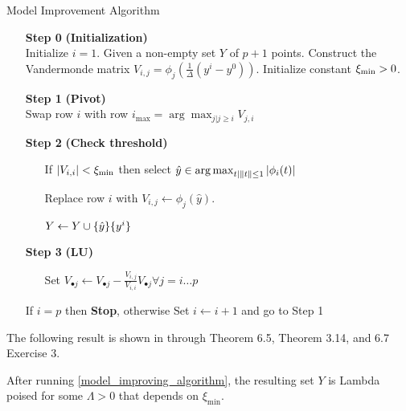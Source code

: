 \begin{algorithm}[H]
    \caption{Model Improvement Algorithm}
    \label{model_improving_algorithm}
    \begin{itemize}
        \item[\textbf{Step 0}] \textbf{(Initialization)} \\
            Initialize $i=1$.
            Given a non-empty set $Y$ of $p+1$ points. 
            Construct the Vandermonde matrix $V_{i,j} = \phi_j(\frac 1 {\Delta}(y^i - y^0))$.
			Initialize constant $\xi_{\text{min}} > 0$.
        \item[\textbf{Step 1}] \textbf{(Pivot)} \\
            Swap row $i$ with row $i_{\max} = \arg \max_{j|j\ge i} V_{j,i} $
        
        \item[\textbf{Step 2}] \textbf{(Check threshold)} \begin{itemize}
                \item[] If $|V_{i,i}| < \xi_{\text{min}}$ then select \label{next_point} $\hat y \in \operatorname*{arg\,max}_{t | \|t\|\le 1} |\phi_i(t)|$
                \item[] Replace row $i$ with $V_{i, j} \gets \phi_j(\hat y)$.
                \item[] $Y \gets Y \cup \{\hat y \}\\ \{y^i\}$
            \end{itemize}
        
        \item[\textbf{Step 3}] \textbf{(LU)} \begin{itemize}
                \item[] Set $V_{\bullet j} \gets V_{\bullet j} - \frac{V_{i,j}}{V_{i, i}} V_{\bullet j} \forall j=i \ldots p$
            \end{itemize}
            If $i = p$ then \textbf{Stop}, otherwise Set $i \gets i+1$ and go to Step 1
    \end{itemize}
\end{algorithm}


The following result is shown in \cite{DUMMY:intro_book} through Theorem 6.5, Theorem 3.14, and 6.7 Exercise 3.
\begin{theorem}
\label{set_is_poised}
After running \cref{model_improving_algorithm}, the resulting set $Y$ is Lambda poised for some $\Lambda > 0$ that depends on $\xi_{\text{min}}$.
\end{theorem}

